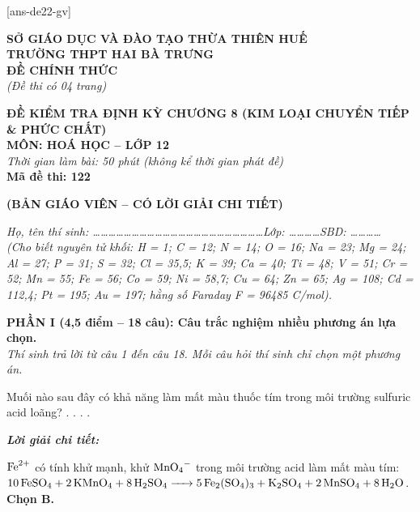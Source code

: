 \documentclass[11pt,a4paper]{article}
\def\loigiai#1{
\par\begingroup\color{blue!80!black}\small
\noindent\textbf{\textit{Lời giải chi tiết:}}\par
#1\par\endgroup}
\begin{document}
[ans-de22-gv]

\noindent
\begin{minipage}[t]{0.48\textwidth}
	\textbf{SỞ GIÁO DỤC VÀ ĐÀO TẠO THỪA THIÊN HUẾ}\\
	\textbf{TRƯỜNG THPT HAI BÀ TRƯNG}\\
	\textbf{ĐỀ CHÍNH THỨC}\\
	\textit{(Đề thi có 04 trang)}
\end{minipage}\hfill
\begin{minipage}[t]{0.48\textwidth}
	\raggedleft
	\textbf{\color{mainGreen}ĐỀ KIỂM TRA ĐỊNH KỲ CHƯƠNG 8 (KIM LOẠI CHUYỂN TIẾP \& PHỨC CHẤT)}\\
	\textbf{MÔN: HOÁ HỌC -- LỚP 12}\\
	\textit{Thời gian làm bài: 50 phút (không kể thời gian phát đề)}\\
	\textbf{Mã đề thi: 122}
\end{minipage}


\vspace{0.1cm}
\begin{center}
	\textbf{\color{hfRed}\Large (BẢN GIÁO VIÊN -- CÓ LỜI GIẢI CHI TIẾT)}
\end{center}

\vspace{1pt}
\noindent\textit{Họ, tên thí sinh: \dots\dots\dots\dots\dots\dots\dots\dots\dots\dots\dots\dots\dots\dots\dots\dots\dots\dots\dots\dots\dots\dots Lớp: \dots\dots\dots\dots SBD: \dots\dots\dots\dots}\\
\noindent\textit{(Cho biết nguyên tử khối: H = 1; C = 12; N = 14; O = 16; Na = 23; Mg = 24; Al = 27; P = 31; S = 32; Cl = 35,5; K = 39; Ca = 40; Ti = 48; V = 51; Cr = 52; Mn = 55; Fe = 56; Co = 59; Ni = 58,7; Cu = 64; Zn = 65; Ag = 108; Cd = 112,4; Pt = 195; Au = 197; hằng số Faraday F = 96485 C/mol).}

\vspace{1pt}
\noindent
\textbf{PHẦN I (4,5 điểm -- 18 câu): Câu trắc nghiệm nhiều phương án lựa chọn.}\\
\textit{Thí sinh trả lời từ câu 1 đến câu 18. Mỗi câu hỏi thí sinh chỉ chọn một phương án.}

\begin{ex}
Muối nào sau đây có khả năng làm mất màu thuốc tím trong môi trường sulfuric acid loãng?
\choice
{.}
{\True {}.}
{.}
{.}
\loigiai{
$\ce{Fe^2+}$ có tính khử mạnh, khử $\ce{MnO4-}$ trong môi trường acid làm mất màu tím:\\
$\ce{10FeSO4 + 2KMnO4 + 8H2SO4 -> 5Fe2(SO4)3 + K2SO4 + 2MnSO4 + 8H2O}$.\\
\textbf{Chọn B.}}
\end{ex}
\end{document}
